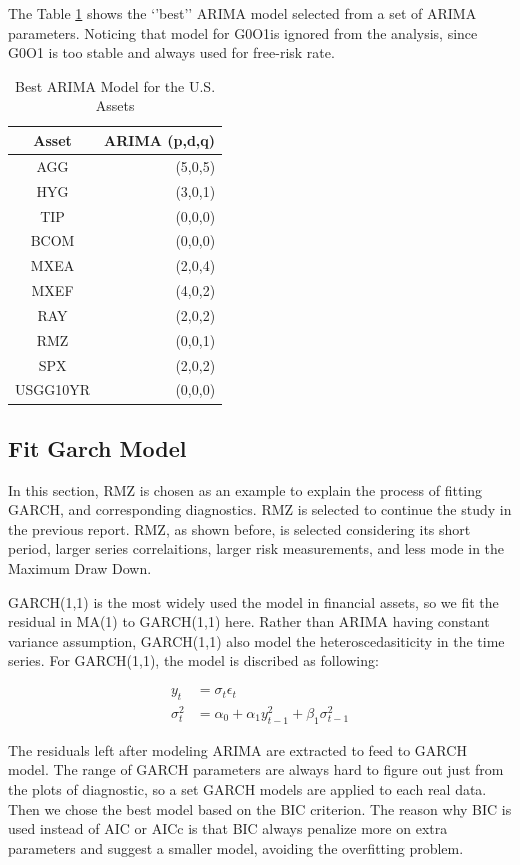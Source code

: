 \documentclass[12pt]{article}
\begin{document}
The Table \ref{table:BestArima} shows the `'best'' ARIMA model selected from a set of ARIMA parameters. Noticing that model for G0O1is ignored from the analysis, since G0O1 is too stable and always used for free-risk rate.

\begin{table}[!h]
\caption{Best ARIMA Model for the U.S. Assets }
\centering 
\begin{tabular}{ | c || r | } 
 \hline
Asset & ARIMA (p,d,q) \\
  \hline \hline
AGG & (5,0,5) \\ 
HYG & (3,0,1) \\ 
TIP &  (0,0,0)\\ 
BCOM & (0,0,0)\\ 
MXEA & (2,0,4) \\ 
MXEF & (4,0,2)\\ 
RAY &  (2,0,2)\\ 
RMZ & (0,0,1) \\ 
SPX & (2,0,2) \\ 
USGG10YR & (0,0,0) \\
 \hline
\end{tabular}
\label{table:BestArima}
\end{table}

\subsection{Fit Garch Model}
In this section,  RMZ is chosen as an example to explain the process of fitting GARCH, and corresponding diagnostics. RMZ is selected to continue the study in the previous report. RMZ, as shown before, is selected considering its short period, larger series correlaitions, larger risk measurements, and less mode in the Maximum Draw Down.

GARCH(1,1) is the most widely used the model in financial assets, so we fit the residual in MA(1) to GARCH(1,1) here. Rather than ARIMA having constant variance assumption, GARCH(1,1) also model the heteroscedasiticity in the time series.  For GARCH(1,1), the model is discribed as following:

\begin{align*}
y_t & = \sigma_t \epsilon_t\\
\sigma_t^2 & = \alpha_0+ \alpha_1 y_{t-1}^2 +\beta_1\sigma_{t-1}^2
\end{align*}


The residuals left after modeling ARIMA are extracted to feed to GARCH model. The range of GARCH parameters are always hard to figure out just from the plots of diagnostic, so a set GARCH models are applied to each real data. Then we chose the best model based on the BIC criterion. The reason why BIC is used instead of AIC or AICc is that BIC always penalize more on extra parameters and suggest a smaller model, avoiding the overfitting problem.
\end{document}
